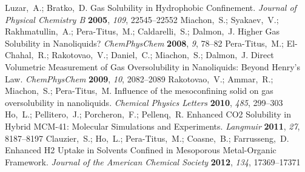 \documentclass[aps,prl,twocolumn,superscriptaddress,groupedaddress]{revtex4}
\begin{document}
\begin{mcitethebibliography}{88}
Luzar,~A.; Bratko,~D. Gas Solubility in Hydrophobic Confinement. \emph{Journal
  of Physical Chemistry B} \textbf{2005}, \emph{109}, 22545--22552\relax
\mciteBstWouldAddEndPuncttrue
\mciteSetBstMidEndSepPunct{\mcitedefaultmidpunct}
{\mcitedefaultendpunct}{\mcitedefaultseppunct}\relax
\EndOfBibitem
{}
Miachon,~S.; Syakaev,~V.; Rakhmatullin,~A.; Pera-Titus,~M.; Caldarelli,~S.;
  Dalmon,~J. Higher Gas Solubility in Nanoliquids? \emph{ChemPhysChem}
  \textbf{2008}, \emph{9}, 78--82\relax
\mciteBstWouldAddEndPuncttrue
\mciteSetBstMidEndSepPunct{\mcitedefaultmidpunct}
{\mcitedefaultendpunct}{\mcitedefaultseppunct}\relax
\EndOfBibitem
{}
Pera-Titus,~M.; El-Chahal,~R.; Rakotovao,~V.; Daniel,~C.; Miachon,~S.;
  Dalmon,~J. Direct Volumetric Measurement of Gas Oversolubility in
  Nanoliquids: Beyond Henry’s Law. \emph{ChemPhysChem} \textbf{2009},
  \emph{10}, 2082--2089\relax
\mciteBstWouldAddEndPuncttrue
\mciteSetBstMidEndSepPunct{\mcitedefaultmidpunct}
{\mcitedefaultendpunct}{\mcitedefaultseppunct}\relax
\EndOfBibitem
{}
Rakotovao,~V.; Ammar,~R.; Miachon,~S.; Pera-Titus,~M. Influence of the
  mesoconfining solid on gas oversolubility in nanoliquids. \emph{Chemical
  Physics Letters} \textbf{2010}, \emph{485}, 299--303\relax
\mciteBstWouldAddEndPuncttrue
\mciteSetBstMidEndSepPunct{\mcitedefaultmidpunct}
{\mcitedefaultendpunct}{\mcitedefaultseppunct}\relax
\EndOfBibitem
{}
Ho,~L.; Pellitero,~J.; Porcheron,~F.; Pellenq,~R. Enhanced CO2 Solubility in
  Hybrid MCM-41: Molecular Simulations and Experiments. \emph{Langmuir}
  \textbf{2011}, \emph{27}, 8187--8197\relax
\mciteBstWouldAddEndPuncttrue
\mciteSetBstMidEndSepPunct{\mcitedefaultmidpunct}
{\mcitedefaultendpunct}{\mcitedefaultseppunct}\relax
\EndOfBibitem
{}
Clauzier,~S.; Ho,~L.; Pera-Titus,~M.; Coasne,~B.; Farrusseng,~D. Enhanced H2
  Uptake in Solvents Confined in Mesoporous Metal-Organic Framework.
  \emph{Journal of the American Chemical Society} \textbf{2012}, \emph{134},
  17369--17371\relax
\mciteBstWouldAddEndPuncttrue
\mciteSetBstMidEndSepPunct{\mcitedefaultmidpunct}
{\mcitedefaultendpunct}{\mcitedefaultseppunct}\relax

\end{mcitethebibliography}
\end{document}
